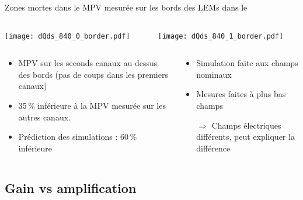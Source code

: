     \begin{frame}{Zones mortes dans le \TOO{}}{MPV mesurée sur les bords des LEMs dans le \TOO{}}
        \begin{scriptsize}
            \begin{columns}
                \begin{column}{0.5\textwidth}
                    \texttt{[image: dQds\_840\_0\_border.pdf]}
                \end{column}
                \begin{column}{0.5\textwidth}
                    \texttt{[image: dQds\_840\_1\_border.pdf]}
                \end{column}
            \end{columns}
            \begin{columns}
                \begin{column}{0.5\textwidth}
                    \begin{itemize}
                        \item MPV sur les seconds canaux au dessus des bords (pas de coups dans les premiers canaux)
                        \item 35\,\% inférieure à la MPV mesurée sur les autres canaux.
                        \item Prédiction des simulations : 60\,\% inférieure
                    \end{itemize}
                \end{column}
                \begin{column}{0.5\textwidth}
                    \begin{itemize}
                        \item Simulation faite aux champs nominaux
                        \item Mesures faites à plus bas champs
                        \item[$\Rightarrow$] Champs électriques différents, peut expliquer la différence 
                    \end{itemize}
                \end{column}
            \end{columns}
        \end{scriptsize}
    \end{frame}

  \subsection{Gain vs amplification}

